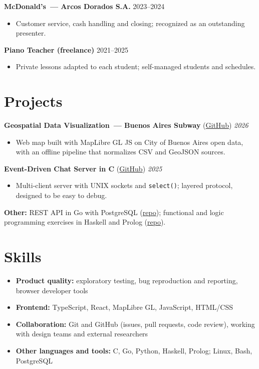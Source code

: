 \noindent \textbf{McDonald's~--- Arcos Dorados S.A.} \hfill 2023--2024
\begin{itemize}
  \item Customer service, cash handling and closing; recognized as an outstanding presenter.
\end{itemize}

\noindent \textbf{Piano Teacher (freelance)} \hfill 2021--2025
\begin{itemize}
  \item Private lessons adapted to each student; self-managed students and schedules.
\end{itemize}

\section*{Projects}
\noindent \textbf{Geospatial Data Visualization~--- Buenos Aires Subway} (\href{https://github.com/Yarthax23/urbanly-subte-map}{GitHub}) \hfill \textit{2026}
\begin{itemize}
  \item Web map built with MapLibre GL JS on City of Buenos Aires open data, with an offline pipeline that
        normalizes CSV and GeoJSON sources.
\end{itemize}

\noindent \textbf{Event-Driven Chat Server in C} (\href{https://github.com/Yarthax23/unix-chat-server}{GitHub}) \hfill \textit{2025}
\begin{itemize}
  \item Multi-client server with UNIX sockets and \texttt{select()}; layered protocol, designed to be easy to debug.
\end{itemize}

\noindent \textbf{Other:} REST API in Go with PostgreSQL
(\href{https://github.com/Yarthax23/go-todo-api}{repo}); functional and logic programming exercises in
Haskell and Prolog (\href{https://github.com/juop12/Exactas-PLP-cNil}{repo}).

\section*{Skills}
\begin{itemize}
  \item \textbf{Product quality:} exploratory testing, bug reproduction and reporting, browser developer tools
  \item \textbf{Frontend:} TypeScript, React, MapLibre GL, JavaScript, HTML/CSS
  \item \textbf{Collaboration:} Git and GitHub (issues, pull requests, code review), working with design teams and external researchers
  \item \textbf{Other languages and tools:} C, Go, Python, Haskell, Prolog; Linux, Bash, PostgreSQL
\end{itemize}

